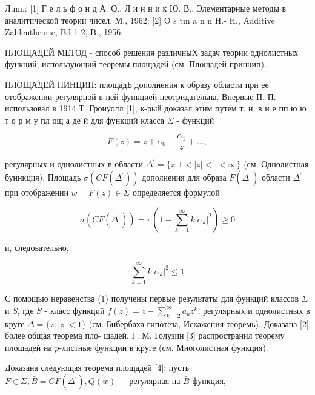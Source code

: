 \documentclass[10pt]{article}
\begin{document}
Лum.: [1] Г е л ь ф о н д А. О., Л и н н и к Ю. В., Элементарные методы в аналитической теории чисел, М., 1962; [2] $\mathrm{O}$ s tm a n n H.- H., Additive Zahlentheorie, Bd 1-2, B., 1956.



ПЛОЩАДЕЙ МЕТОД - способ решения различныХ задач теории однолистных функций, использующий теоремы площадей (см. Площадей принцип).



ПЛОЩАДЕЙ ПИНЦИП: площадЬ дополнения к образу области при ее отображении регулярной в ней функцией неотридательна. Впервые П. П. использовал в 1914 Т. Гронуолл [1], к-рый доказал этим путем т. н. в н е пп ю ю т о р м у пл ощ а де й для функций класса $\Sigma$ - функций



\[

F(z)=z+\alpha_{0}+\frac{\alpha_{1}}{z}+\ldots,

\]



регулярных и однолистных в области $\Delta^{\prime}=\{z: 1<|z|<$ $<\infty\}$ (см. Однолистная буннкция). Площадь $\sigma\left(C F\left(\Delta^{\prime}\right)\right)$ дополнения для образа $F\left(\Delta^{\prime}\right)$ области $\Delta^{\prime}$ при отображении $w=F(z) \in \Sigma$ определяется формулой



\[

\sigma\left(C F\left(\Delta^{\prime}\right)\right)=\pi\left(1-\sum_{k=1}^{\infty} k\left|\alpha_{k}\right|^{2}\right) \geqslant 0

\]



и, следовательно,



\[

\sum_{k=1}^{\infty} k\left|\alpha_{k}\right|^{2} \leqslant 1

\]



С помощью неравенства (1) получены первые результаты для функций классов $\Sigma$ и $S$, где $S$ - класс функций $f(z)=z-\sum_{k=2}^{\infty} a_{k} z^{k}$, регулярных и однолистных в круге $\Delta=\{z:|z|<1\}$ (см. Бибербаха гипотеза, Искажения теоремь). Доказана [2] более общая теорема пло- щадей. Г. М. Голузин [3] распространил теорему площадей на $p$-листные функции в круге (см. Многолистная функция).



Доказана следующая теорема площадей [4]: пусть $F \in \Sigma, \bar{B}=C F\left(\Delta^{\prime}\right), Q(w)-$ регулярная на $\bar{B}$ функция,
\end{document}
